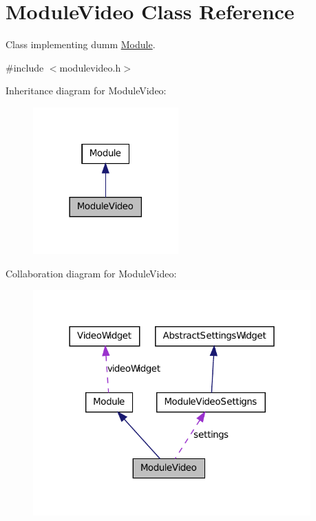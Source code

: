 \hypertarget{class_module_video}{
\section{ModuleVideo Class Reference}
\label{db/d7c/class_module_video}
}


Class implementing dumm \hyperlink{class_module}{Module}.  




{\ttfamily \#include $<$modulevideo.h$>$}



Inheritance diagram for ModuleVideo:
\nopagebreak
\begin{figure}[H]
\begin{center}
\leavevmode
\includegraphics[width=158pt]{d7/dce/class_module_video__inherit__graph}
\end{center}
\end{figure}


Collaboration diagram for ModuleVideo:
\nopagebreak
\begin{figure}[H]
\begin{center}
\leavevmode
\includegraphics[width=302pt]{d4/d89/class_module_video__coll__graph}
\end{center}
\end{figure}
